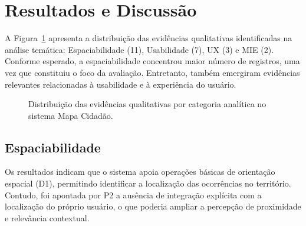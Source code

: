 \documentclass[12pt]{article}
\begin{document}
\section{Resultados e Discussão}



A Figura~\ref{fig:avaliacao-dimensoes} apresenta a distribuição das evidências qualitativas identificadas na análise temática: Espaciabilidade (11), Usabilidade (7), UX (3) e MIE (2). Conforme esperado, a espaciabilidade concentrou maior número de registros, uma vez que constituiu o foco da avaliação. Entretanto, também emergiram evidências relevantes relacionadas à usabilidade e à experiência do usuário.




\begin{figure}[htbp]
    \centering
    \caption{Distribuição das evidências qualitativas por categoria analítica no sistema Mapa Cidadão.}
    \label{fig:avaliacao-dimensoes}
\end{figure}


\subsection{Espaciabilidade}
Os resultados indicam que o sistema apoia operações básicas de orientação espacial (D1), permitindo identificar a localização das ocorrências no território. Contudo, foi apontada por P2 a ausência de integração explícita com a localização do próprio usuário, o que poderia ampliar a percepção de proximidade e relevância contextual.
\end{document}
